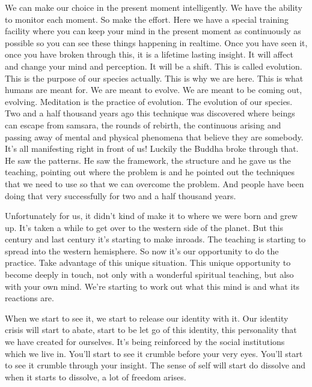 \documentclass[letterpaper,10pt,english]{sphinxmanual}
\begin{document}
\sphinxAtStartPar
We can make our choice in the present moment intelligently. We have
the ability to monitor each moment. So make the effort. Here we have a special training facility where you can keep your mind in the present moment as
continuously as possible so you can see these things happening in real\sphinxhyphen{}time.
Once you have seen it, once you have broken through this, it is a lifetime
lasting insight. It will affect and change your mind and perception. It will be
a shift. This is called evolution. This is the purpose of our species actually.
This is why we are here. This is what humans are meant for. We are meant to
evolve. We are meant to be coming out, evolving. Meditation is the practice
of evolution. The evolution of our species. Two and a half thousand years
ago this technique was discovered where beings can escape from samsara,
the  rounds  of  rebirth,  the  continuous  arising  and  passing  away  of  mental
and physical phenomena that believe they are somebody. It’s all manifesting right in front of us! Luckily the Buddha broke through that. He saw the
patterns. He saw the framework, the structure and he gave us the teaching,
pointing out where the problem is and he pointed out the techniques that we
need  to  use  so  that  we  can  overcome  the  problem. And  people  have  been
doing that very successfully for two and a half thousand years.

\sphinxAtStartPar
Unfortunately for us, it didn’t kind of make it to where we were born
and grew up. It’s taken a while to get over to the western side of the planet.
  But this century and last century it’s starting to make inroads. The teaching
is starting to spread into the western hemisphere. So now it’s our opportunity to do the practice. Take advantage of this unique situation. This unique
opportunity to become deeply in touch, not only with a wonderful spiritual
teaching, but also with your own mind. We’re starting to work out what this
mind is and what its reactions are.

\sphinxAtStartPar
When  we  start  to  see  it,  we  start  to  release  our  identity  with  it.  Our
identity crisis will start to abate, start to be let go of this identity, this personality that we have created for ourselves. It’s being reinforced by the social
institutions which we live in. You’ll start to see it crumble before your very
eyes. You’ll start to see it crumble through your insight. The sense of self
will start do dissolve and when it starts to dissolve, a lot of freedom arises.
\end{document}
